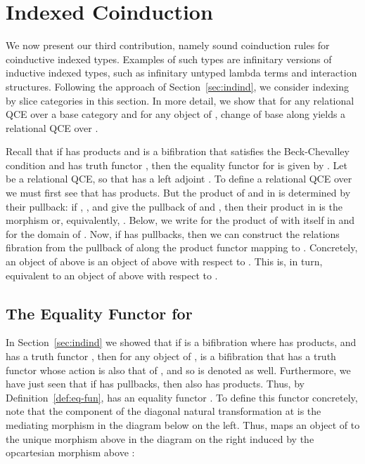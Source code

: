 \documentclass{LMCS}
\theoremstyle{plain}
\theoremstyle{remark}
\theoremstyle{definition}
\begin{document}
\section{Indexed Coinduction}\label{sec:indcoind}

We now present our third contribution, namely sound coinduction rules
for coinductive indexed types. Examples of such types are infinitary
versions of inductive indexed types, such as infinitary untyped lambda
terms and interaction structures. Following the approach of
Section~\ref{sec:indind}, we consider indexing by slice categories in
this section. In more detail, we show that for any relational QCE over
a base category  and for any object  of , change of base
along  yields a relational QCE over .

Recall that if  has products and  is a bifibration
that satisfies the Beck-Chevalley condition and has truth functor ,
then the equality functor  for  is given by . Let  be a relational QCE, so
that  has a left adjoint . To define a relational QCE over
 we must first see that  has products. But the product of
 and  in  is determined by their pullback: if , , and  give the pullback of  and , then their
product in  is the morphism  or, equivalently, . Below,
we write  for the product of  with itself in 
and  for the domain of . Now, if  has pullbacks, then
we can construct the relations fibration 
from the pullback of  along the product functor  mapping  to . Concretely, an object of 
above  is an object of  above  with respect to
. This is, in turn, equivalent to an object of  above 
with respect to .

\subsection{The Equality Functor for }\label{sec:eqU/I}

In Section~\ref{sec:indind} we showed that if  is a bifibration
where  has products, and  has a truth functor , then for any
object  of ,  is a bifibration that has a truth functor
whose action is also that of , and so is denoted  as
well. Furthermore, we have just seen that if  has pullbacks, then
 also has products.  Thus, by Definition~\ref{def:eq-fun}, 
has an equality functor . To define this functor concretely,
note that the component of the diagonal natural transformation
 at  is the
mediating morphism in the diagram below on the left.  Thus, 
maps an object  of  to the unique morphism above
 in the diagram on the right induced by the opcartesian morphism
 above :
 
\end{document}

